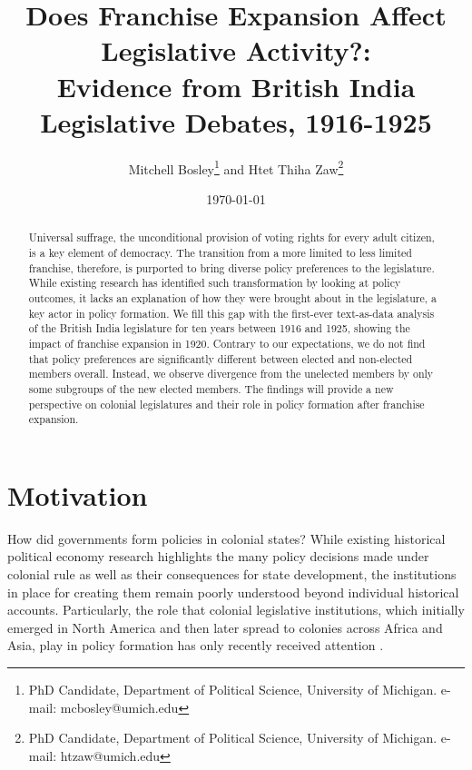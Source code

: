 \documentclass[12pt,letter]{article}
\begin{document}
\setcounter{page}{1}

\title{\Large Does Franchise Expansion Affect Legislative Activity?:\\ Evidence from British India Legislative Debates, 1916-1925}
\author{Mitchell Bosley\thanks{PhD Candidate, Department of Political Science, University of Michigan. e-mail: mcbosley@umich.edu} and Htet Thiha Zaw\thanks{PhD Candidate, Department of Political Science, University of Michigan. e-mail: htzaw@umich.edu}}
\date{\today}
\maketitle
\begin{abstract}
\noindent Universal suffrage, the unconditional provision of voting rights for every adult citizen, is a key element of democracy. The transition from a more limited to less limited franchise, therefore, is purported to bring diverse policy preferences to the legislature. While existing research has identified such transformation by looking at policy outcomes, it lacks an explanation of how they were brought about in the legislature, a key actor in policy formation. We fill this gap with the first-ever text-as-data analysis of the British India legislature for ten years between 1916 and 1925, showing the impact of franchise expansion in 1920. Contrary to our expectations, we do not find that policy preferences are significantly different between elected and non-elected members overall. Instead, we observe divergence from the unelected members by only some subgroups of the new elected members. The findings will provide a new perspective on colonial legislatures and their role in policy formation after franchise expansion.\\

\end{abstract}

\doublespacing

\section{Motivation}
How did governments form policies in colonial states? While existing historical political economy research highlights the many policy decisions made under colonial rule as well as their consequences for state development, the institutions in place for creating them remain poorly understood beyond individual historical accounts. Particularly, the role that colonial legislative institutions, which initially emerged in North America and then later spread to colonies across Africa and Asia, play in policy formation has only recently received attention \parencite{gailmardBuildingNewImperial2017,paineDemocraticContradictionsEuropean2019}.
\end{document}
